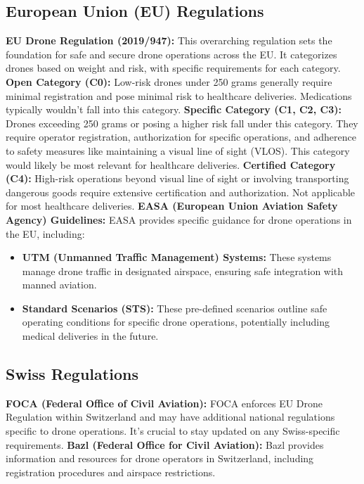 \subsection{European Union (EU) Regulations}
\textbf{EU Drone Regulation (2019/947):} This overarching regulation sets the foundation for safe and secure drone operations across the EU. It categorizes drones based on weight and risk, with specific requirements for each category.
\newline
\textbf{Open Category (C0):} Low-risk drones under 250 grams generally require minimal registration and pose minimal risk to healthcare deliveries. Medications typically wouldn't fall into this category.
\newline
\textbf{Specific Category (C1, C2, C3):} Drones exceeding 250 grams or posing a higher risk fall under this category. They require operator registration, authorization for specific operations, and adherence to safety measures like maintaining a visual line of sight (VLOS). This category would likely be most relevant for healthcare deliveries.
\newline
\textbf{Certified Category (C4):} High-risk operations beyond visual line of sight or involving transporting dangerous goods require extensive certification and authorization. Not applicable for most healthcare deliveries.
\newline
\textbf{EASA (European Union Aviation Safety Agency) Guidelines:} EASA provides specific guidance for drone operations in the EU, including:
\begin{itemize}
  \item \textbf{UTM (Unmanned Traffic Management) Systems:} These systems manage drone traffic in designated airspace, ensuring safe integration with manned aviation.
  \item \textbf{Standard Scenarios (STS):} These pre-defined scenarios outline safe operating conditions for specific drone operations, potentially including medical deliveries in the future.
\end{itemize}
\subsection{Swiss Regulations}
\textbf{FOCA (Federal Office of Civil Aviation):} FOCA enforces EU Drone Regulation within Switzerland and may have additional national regulations specific to drone operations. It's crucial to stay updated on any Swiss-specific requirements.
\newline
\textbf{Bazl (Federal Office for Civil Aviation):} Bazl provides information and resources for drone operators in Switzerland, including registration procedures and airspace restrictions.
